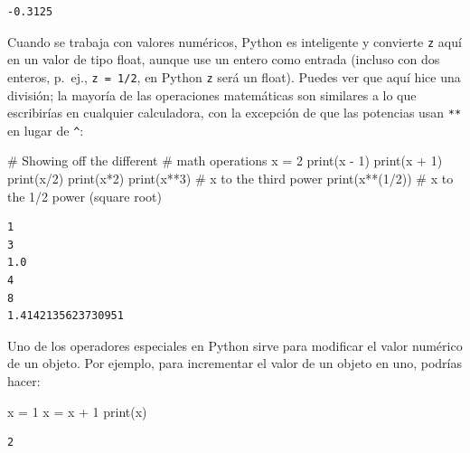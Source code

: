 \documentclass[
  letterpaper,
]{scrbook}
\newenvironment{Shaded}{\begin{snugshade}}{\end{snugshade}}
\newcommand{\BuiltInTok}[1]{\textcolor[rgb]{0.00,0.23,0.31}{#1}}
\newcommand{\CommentTok}[1]{\textcolor[rgb]{0.37,0.37,0.37}{#1}}
\newcommand{\DecValTok}[1]{\textcolor[rgb]{0.68,0.00,0.00}{#1}}
\newcommand{\NormalTok}[1]{\textcolor[rgb]{0.00,0.23,0.31}{#1}}
\newcommand{\OperatorTok}[1]{\textcolor[rgb]{0.37,0.37,0.37}{#1}}
\begin{document}
\begin{verbatim}
-0.3125
\end{verbatim}

Cuando se trabaja con valores numéricos, Python es inteligente y
convierte \texttt{z} aquí en un valor de tipo float, aunque use un
entero como entrada (incluso con dos enteros, p.~ej.,
\texttt{z\ =\ 1/2}, en Python \texttt{z} será un float). Puedes ver que
aquí hice una división; la mayoría de las operaciones matemáticas son
similares a lo que escribirías en cualquier calculadora, con la
excepción de que las potencias usan \texttt{**} en lugar de
\texttt{\^{}}:

\begin{Shaded}
\begin{Highlighting}[]
\CommentTok{\# Showing off the different}
\CommentTok{\# math operations}
\NormalTok{x }\OperatorTok{=} \DecValTok{2}
\BuiltInTok{print}\NormalTok{(x }\OperatorTok{{-}} \DecValTok{1}\NormalTok{)}
\BuiltInTok{print}\NormalTok{(x }\OperatorTok{+} \DecValTok{1}\NormalTok{)}
\BuiltInTok{print}\NormalTok{(x}\OperatorTok{/}\DecValTok{2}\NormalTok{)}
\BuiltInTok{print}\NormalTok{(x}\OperatorTok{*}\DecValTok{2}\NormalTok{)}
\BuiltInTok{print}\NormalTok{(x}\OperatorTok{**}\DecValTok{3}\NormalTok{)      }\CommentTok{\# x to the third power}
\BuiltInTok{print}\NormalTok{(x}\OperatorTok{**}\NormalTok{(}\DecValTok{1}\OperatorTok{/}\DecValTok{2}\NormalTok{))  }\CommentTok{\# x to the 1/2 power (square root)}
\end{Highlighting}
\end{Shaded}

\begin{verbatim}
1
3
1.0
4
8
1.4142135623730951
\end{verbatim}

Uno de los operadores especiales en Python sirve para modificar el valor
numérico de un objeto. Por ejemplo, para incrementar el valor de un
objeto en uno, podrías hacer:

\begin{Shaded}
\begin{Highlighting}[]
\NormalTok{x }\OperatorTok{=} \DecValTok{1}
\NormalTok{x }\OperatorTok{=}\NormalTok{ x }\OperatorTok{+} \DecValTok{1}
\BuiltInTok{print}\NormalTok{(x)}
\end{Highlighting}
\end{Shaded}

\begin{verbatim}
2
\end{verbatim}
\end{document}
